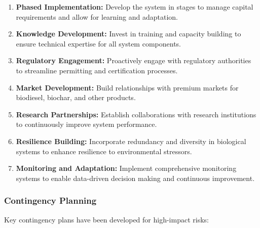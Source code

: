 \begin{enumerate}
    \item \textbf{Phased Implementation:} Develop the system in stages to manage capital requirements and allow for learning and adaptation.
    
    \item \textbf{Knowledge Development:} Invest in training and capacity building to ensure technical expertise for all system components.
    
    \item \textbf{Regulatory Engagement:} Proactively engage with regulatory authorities to streamline permitting and certification processes.
    
    \item \textbf{Market Development:} Build relationships with premium markets for biodiesel, biochar, and other products.
    
    \item \textbf{Research Partnerships:} Establish collaborations with research institutions to continuously improve system performance.
    
    \item \textbf{Resilience Building:} Incorporate redundancy and diversity in biological systems to enhance resilience to environmental stressors.
    
    \item \textbf{Monitoring and Adaptation:} Implement comprehensive monitoring systems to enable data-driven decision making and continuous improvement.
\end{enumerate}

\subsubsection{Contingency Planning}

Key contingency plans have been developed for high-impact risks:

